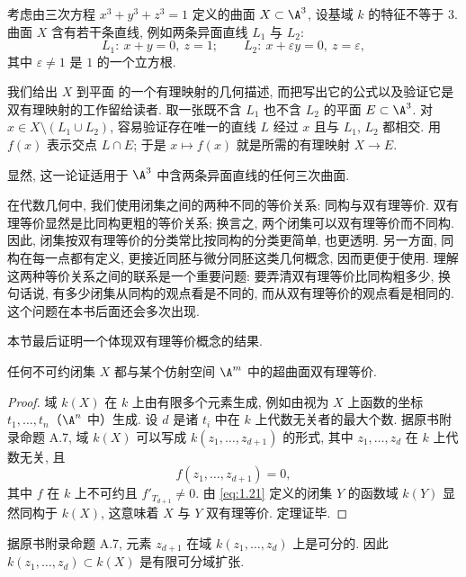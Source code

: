 \begin{example}\label{exam:cubic-surface-lines}
	考虑由三次方程 $x^3 + y^3 + z^3 = 1$ 定义的曲面 $X \subset \A^3$, 设基域 $k$ 的特征不等于 $3$. 曲面 $X$ 含有若干条直线, 例如两条异面直线 $L_1$ 与 $L_2$:
	\[
		L_1:\ x + y = 0,\ z = 1; \qquad L_2:\ x + \varepsilon y = 0,\ z = \varepsilon,
	\]
	其中 $\varepsilon \ne 1$ 是 $1$ 的一个立方根.

	我们给出 $X$ 到平面 的一个有理映射的几何描述, 而把写出它的公式以及验证它是双有理映射的工作留给读者. 取一张既不含 $L_1$ 也不含 $L_2$ 的平面 $E \subset \A^3$. 对 $x \in X \setminus (L_1 \cup L_2)$, 容易验证存在唯一的直线 $L$ 经过 $x$ 且与 $L_1$, $L_2$ 都相交. 用 $f(x)$ 表示交点 $L \cap E$; 于是 $x \mapsto f(x)$ 就是所需的有理映射 $X \to E$.

	显然, 这一论证适用于 $\A^3$ 中含两条异面直线的任何三次曲面.
\end{example}

在代数几何中, 我们使用闭集之间的两种不同的等价关系: 同构与双有理等价. 双有理等价显然是比同构更粗的等价关系; 换言之, 两个闭集可以双有理等价而不同构. 因此, 闭集按双有理等价的分类常比按同构的分类更简单, 也更透明. 另一方面, 同构在每一点都有定义, 更接近同胚与微分同胚这类几何概念, 因而更便于使用. 理解这两种等价关系之间的联系是一个重要问题: 要弄清双有理等价比同构粗多少, 换句话说, 有多少闭集从同构的观点看是不同的, 而从双有理等价的观点看是相同的. 这个问题在本书后面还会多次出现.

本节最后证明一个体现双有理等价概念的结果.

\begin{theorem}\label{thm:birational-hypersurface}
	任何不可约闭集 $X$ 都与某个仿射空间 $\A^m$ 中的超曲面双有理等价.
\end{theorem}

\begin{proof}
	域 $k(X)$ 在 $k$ 上由有限多个元素生成, 例如由视为 $X$ 上函数的坐标 $t_1, \ldots, t_n$（$\A^n$ 中）生成. 设 $d$ 是诸 $t_i$ 中在 $k$ 上代数无关者的最大个数. 据原书附录命题 A.7, 域 $k(X)$ 可以写成 $k(z_1, \ldots, z_{d+1})$ 的形式, 其中 $z_1, \ldots, z_d$ 在 $k$ 上代数无关, 且
	\begin{equation}
		\label{eq:1.21}
		f(z_1, \ldots, z_{d+1}) = 0,
	\end{equation}
	其中 $f$ 在 $k$ 上不可约且 $f'_{T_{d+1}} \ne 0$. 由 \eqref{eq:1.21} 定义的闭集 $Y$ 的函数域 $k(Y)$ 显然同构于 $k(X)$, 这意味着 $X$ 与 $Y$ 双有理等价. 定理证毕.
\end{proof}

\begin{remark}\label{rem:separable}
	据原书附录命题 A.7, 元素 $z_{d+1}$ 在域 $k(z_1, \ldots, z_d)$ 上是可分的. 因此 $k(z_1, \ldots, z_d) \subset k(X)$ 是有限可分域扩张.
\end{remark}

